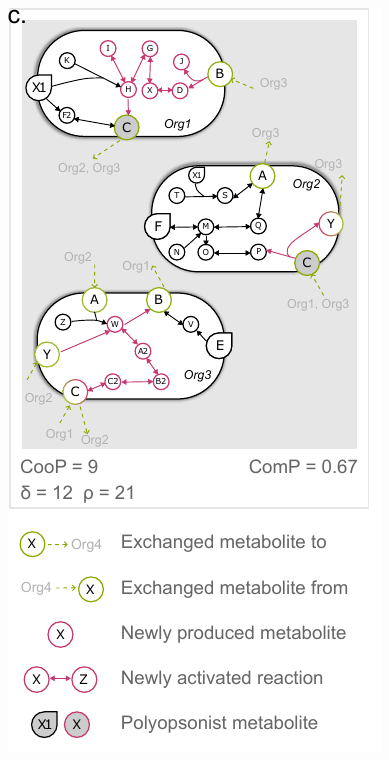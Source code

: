 \documentclass[8pt]{beamer}
\begin{document}
\begin{frame}[fragile]
\begin{onlyenv}
\begin{minipage}{0.5\textwidth}
\end{minipage}%
\hspace{0.5cm}
\hfill
\begin{minipage}{0.4\textwidth}
\includegraphics[width=\textwidth]{figures/score-taille-3.pdf}
\end{minipage}
\end{onlyenv}



\end{frame}

\tiny
\printbibliography
\end{document}
